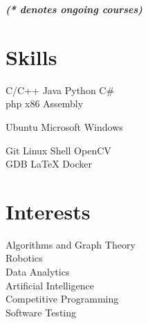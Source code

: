 \documentclass[a4paper]{deedy-resume} %
\begin{document}
\begin{minipage}[t]{0.33\textwidth}
  {\footnotesize \textit{\textbf{(* denotes ongoing courses) }}} \\

  \sectionspace

  \section{Skills}

  \runsubsection{}
  C/C++ \textbullet{} Java \textbullet{} Python \textbullet{} C\# \\ \textbullet{} php \textbullet{} x86 Assembly

  \sectionspace
  \sectionspace

  Ubuntu \textbullet{} Microsoft Windows

  \sectionspace
  \sectionspace

  Git \textbullet{} Linux Shell \textbullet{} OpenCV \\
  \textbullet{} GDB \textbullet{} \LaTeX \textbullet{} Docker

  \sectionspace
  \sectionspace

  \section{Interests}
  Algorithms and Graph Theory \\
  Robotics \\
  Data Analytics \\
  Artificial Intelligence \\
  Competitive Programming \\
  Software Testing

\end{minipage}
\hfill
\end{document}

